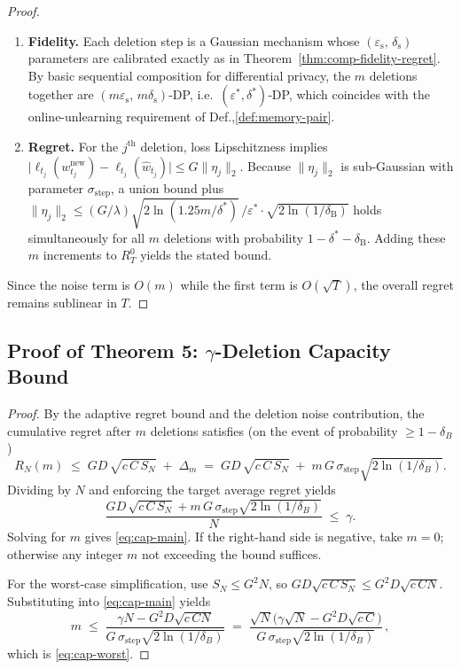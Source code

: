 \documentclass{article}
\theoremstyle{ssltheorem}
\begin{document}
\begin{proof}

\begin{enumerate}
    \item \textbf{Fidelity.} Each deletion step is a Gaussian mechanism whose $(\varepsilon_{\text{s}},\, \delta_{\text{s}})$ parameters are calibrated exactly as in Theorem~\ref{thm:comp-fidelity-regret}.
By basic sequential composition for differential privacy, the $m$ deletions together are $(m\varepsilon_{\text{s}},\,m\delta_{\text{s}})$‑DP, i.e.\
$(\varepsilon^{*},\delta^{*})$‑DP, which coincides with the online-unlearning requirement of Def.,\ref{def:memory-pair}.
\item \textbf{Regret.} For the $j^{\text{th}}$ deletion, loss Lipschitzness implies 
$\bigl|\ell_{t_{j}}(w_{t_{j}}^{\text{new}})-\ell_{t_{j}}(\hat w_{t_{j}})\bigr|
      \le G\lVert\eta_{j}\rVert_{2}$.
Because $\lVert\eta_{j}\rVert_{2}$ is sub-Gaussian with parameter
$\sigma_{\text{step}}$, a union bound plus
$\|\eta_{j}\|_{2} \le
  (G/\lambda)\sqrt{2\ln(1.25m/\delta^{*})}\,/\varepsilon^{*}
  \cdot\sqrt{2\ln(1/\delta_{\mathrm{B}})}$
holds simultaneously for all $m$ deletions
with probability $1-\delta^{*}-\delta_{\mathrm{B}}$.
Adding these $m$ increments to $R_{T}^{0}$ yields the stated bound.
\end{enumerate}

Since the noise term is $O(m)$ while the first term is
$O(\sqrt{T})$, the overall regret remains sublinear in $T$.
\end{proof}

\subsection{Proof of Theorem 5: $\gamma$-Deletion Capacity Bound}
\begin{proof}
By the adaptive regret bound and the deletion noise contribution,
the cumulative regret after $m$ deletions satisfies (on the event of probability $\ge 1-\delta_B$)
$$
R_{N}(m) \;\le\;
GD\,\sqrt{c\,C\,S_{N}} \;+\; \Delta_m
\;=\; GD\,\sqrt{c\,C\,S_{N}} \;+\; m\,G\,\sigma_{\text{step}}\sqrt{2\ln(1/\delta_B)}.
$$
Dividing by $N$ and enforcing the target average regret yields
$$
\frac{GD\,\sqrt{c\,C\,S_{N}} + m\,G\,\sigma_{\text{step}}\sqrt{2\ln(1/\delta_B)}}{N}
\;\le\; \gamma.
$$
Solving for $m$ gives \eqref{eq:cap-main}. If the right-hand side is negative, take $m=0$;
otherwise any integer $m$ not exceeding the bound suffices.

For the worst-case simplification, use $S_{N}\le G^{2} N$, so
$GD\sqrt{c\,C\,S_{N}}\le G^{2} D \sqrt{c\,CN}$.
Substituting into \eqref{eq:cap-main} yields
$$
m \;\le\; \frac{\gamma N - G^{2} D \sqrt{c\,CN}}
{G\,\sigma_{\text{step}}\sqrt{2\ln(1/\delta_B)}}
\;=\; \frac{\sqrt{N}\bigl(\gamma\sqrt{N}-G^{2} D \sqrt{c\,C}\bigr)}
{G\,\sigma_{\text{step}}\sqrt{2\ln(1/\delta_B)}}\,,
$$
which is \eqref{eq:cap-worst}.
\end{proof}
\end{document}
